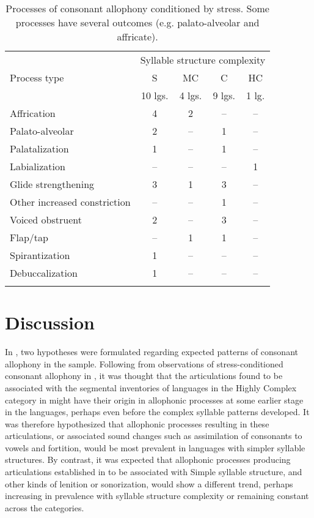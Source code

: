 \begin{table}
\begin{tabular}{lcccc}
\lsptoprule
 & \multicolumn{4}{c}{Syllable structure complexity}\\\cmidrule(lr){2-5}
 Process type & S & MC & C & HC\\
             & 10 lgs. & 4 lgs. & 9 lgs. & 1 lg.\\\midrule
 Affrication & 4 & 2 & -- & --\\
 Palato-alveolar & 2 & -- & 1 & --\\
 Palatalization & 1 & -- & 1 & --\\
 Labialization & -- & -- & -- & 1\\
 Glide strengthening & 3 & 1 & 3 & --\\
 Other increased constriction & -- & -- & 1 & --\\
 Voiced obstruent & 2 & -- & 3 & --\\
 Flap/tap & -- & 1 & 1 & --\\
 Spirantization & 1 & -- & -- & --\\
 Debuccalization & 1 & -- & -- & --\\
\lspbottomrule
\end{tabular}
\caption{\label{tab:7.9}Processes of consonant allophony conditioned by stress. Some processes have several outcomes (e.g. palato-alveolar and affricate).}
\end{table}

\section{Discussion}\label{sec:7.4}

  In , two hypotheses were formulated regarding expected patterns of consonant allophony in the sample. Following from observations of stress-conditioned consonant allophony in , it was thought that the articulations found to be associated with the segmental inventories of languages in the Highly Complex category in  might have their origin in allophonic processes at some earlier stage in the languages, perhaps even before the complex syllable patterns developed. It was therefore hypothesized that allophonic processes resulting in these articulations, or associated sound changes such as assimilation of consonants to vowels and fortition, would be most prevalent in languages with simpler syllable structures. By contrast, it was expected that allophonic processes producing articulations established in  to be associated with Simple syllable structure, and other kinds of lenition or sonorization, would show a different trend, perhaps increasing in prevalence with syllable structure complexity or remaining constant across the categories.

